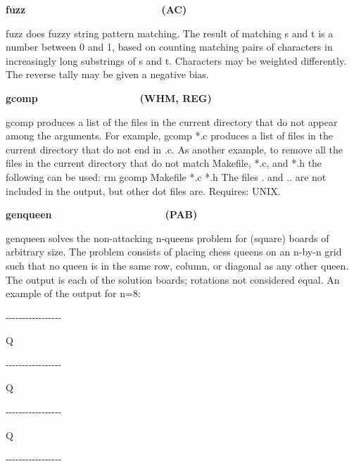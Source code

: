 {\sffamily\bfseries
fuzz\ \ \ \ \ \ \ \ \ \ \ \ \ \ \ \ \ \ \ \ \ \  \ \ (AC)}

\textsf{fuzz} does {\textquotedbl}fuzzy{\textquotedbl} string
pattern matching. The result of matching s and
t is a number between 0 and 1, based on counting matching pairs of
characters in increasingly long substrings of s and t. Characters may
be weighted differently. The reverse tally may be given a negative
bias.

{\sffamily\bfseries
gcomp\ \ \ \ \ \ \ \ \ \ \ \ \ \ \ \ \ \ (WHM, REG)}

\textsf{gcomp} produces a list of the files in the current directory
that do not appear among the arguments. For example, \textsf{gcomp *.c}
produces a list of files in the current directory that do not end in
.c. As another example, to remove all the files in the current
directory that do not match \textsf{Makefile}, \textsf{*.c}, and
\textsf{*.h} the following can be used: \textsf{rm
{\textasciigrave}gcomp Makefile *.c *.h{\textasciigrave}} The files
\textsf{.} and \textsf{..} are not included in the output, but other
{\textasciigrave}dot files{\textquotesingle} are. Requires: UNIX. 

{\sffamily\bfseries
genqueen\ \ \ \ \ \ \ \ \ \ \ \ \ \ \ \ \ \ \ \ (PAB)}

\textsf{genqueen} solves the non-attacking n-queens
problem for (square) boards of arbitrary size. The problem consists of
placing chess queens on an n-by-n grid such that no queen is in the
same row, column, or diagonal as any other queen. The output is each of
the solution boards; rotations not considered equal. An example of the
output for n=8:

{\ttfamily
{}-{}-{}-{}-{}-{}-{}-{}-{}-{}-{}-{}-{}-{}-{}-{}-{}- }

{\ttfamily
{\textbar}Q{\textbar} {\textbar} {\textbar} {\textbar} {\textbar}
{\textbar} {\textbar} {\textbar}}

{\ttfamily
{}-{}-{}-{}-{}-{}-{}-{}-{}-{}-{}-{}-{}-{}-{}-{}-{}-}

{\ttfamily
{\textbar} {\textbar} {\textbar} {\textbar} {\textbar} {\textbar}
{\textbar}Q{\textbar} {\textbar}}

{\ttfamily
{}-{}-{}-{}-{}-{}-{}-{}-{}-{}-{}-{}-{}-{}-{}-{}-{}-}

{\ttfamily
{\textbar} {\textbar} {\textbar} {\textbar} {\textbar}Q{\textbar}
{\textbar} {\textbar} {\textbar}}

{\ttfamily
{}-{}-{}-{}-{}-{}-{}-{}-{}-{}-{}-{}-{}-{}-{}-{}-{}-}


